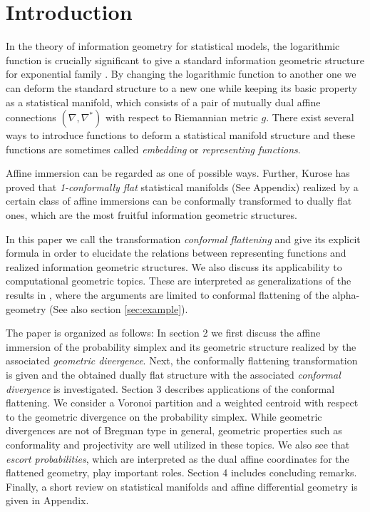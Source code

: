 \documentclass{llncs}
\begin{document}
\section{Introduction}
In the theory of information geometry for statistical models,
the logarithmic function is crucially significant to give a standard 
information geometric structure for exponential family \cite{Amari85,AN}.
By changing the logarithmic
function to another one we can deform the standard structure 
to a new one while keeping its basic property as a statistical manifold, 
which consists of a pair of mutually dual affine connections 
$(\nabla, \nabla^*)$ with respect to Riemannian metric $g$.
There exist several ways \cite{Zhang04,Eguchi04,Naudts04,HSM14} 
to introduce functions to deform a statistical manifold 
structure and these functions are sometimes called 
{\em embedding} or {\em representing functions}. 

Affine immersion \cite{NS} can be regarded as one of possible ways.
Further, Kurose \cite{Kurose94} has proved that {\em 1-conformally flat} 
statistical manifolds (See Appendix) realized by 
a certain class of affine immersions can be conformally transformed to 
dually flat ones, which are the most fruitful 
information geometric structures. 

In this paper we call the transformation {\em conformal flattening} 
and give its explicit formula in order to 
elucidate the relations between representing functions and
realized information geometric structures.
We also discuss its applicability to 
computational geometric topics.
These are interpreted as generalizations of the results in \cite{OMA10,OMA12}, 
where the arguments are limited to conformal flattening of 
the alpha-geometry \cite{Amari85,AN} (See also section \ref{sec:example}).

The paper is organized as follows:
In section 2 we first discuss the affine immersion of 
the probability simplex and its geometric structure realized by
the associated {\em geometric divergence}. 
Next, the conformally flattening transformation is given and 
the obtained dually flat structure with 
the associated {\em conformal divergence} is investigated.
Section 3 describes applications of the conformal flattening.
We consider a Voronoi partition and a weighted centroid 
with respect to the geometric divergence on the probability simplex.
While geometric divergences are not of Bregman type in general, 
geometric properties such as conformality and projectivity are well utilized 
in these topics.
We also see that {\em escort probabilities}, 
which are interpreted as the dual affine coordinates for 
the flattened geometry, play important roles.
Section 4 includes concluding remarks.
Finally, a short review on statistical manifolds and 
affine differential geometry is given in Appendix.
\end{document}
